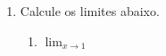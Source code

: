 \documentclass[a4paper, 12pt]{article}
\begin{document}
\begin{enumerate}
\item Calcule os limites abaixo.
\begin{enumerate}
\item $\lim_{x \to 1}$ 
\end{enumerate}
\end{enumerate}
\end{document}
